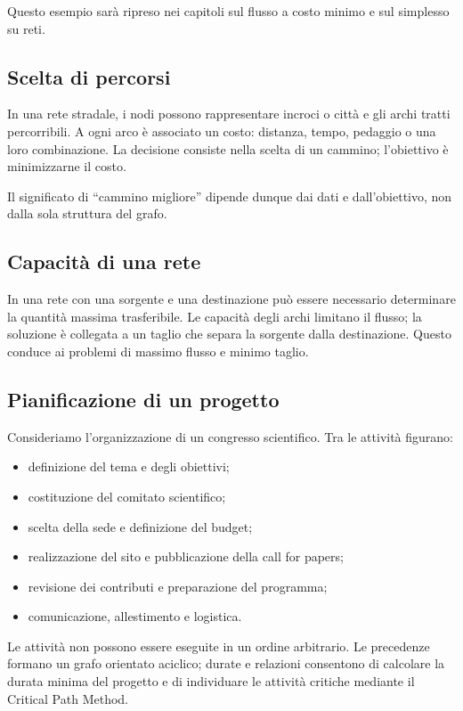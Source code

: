 \documentclass[11pt,a4paper]{article}
\begin{document}
Questo esempio sarà ripreso nei capitoli sul flusso a costo minimo e sul simplesso su reti.

\subsection{Scelta di percorsi}

In una rete stradale, i nodi possono rappresentare incroci o città e gli archi tratti percorribili. A ogni arco è associato un costo: distanza, tempo, pedaggio o una loro combinazione. La decisione consiste nella scelta di un cammino; l'obiettivo è minimizzarne il costo.

Il significato di ``cammino migliore'' dipende dunque dai dati e dall'obiettivo, non dalla sola struttura del grafo.

\subsection{Capacità di una rete}

In una rete con una sorgente e una destinazione può essere necessario determinare la quantità massima trasferibile. Le capacità degli archi limitano il flusso; la soluzione è collegata a un taglio che separa la sorgente dalla destinazione. Questo conduce ai problemi di massimo flusso e minimo taglio.

\subsection{Pianificazione di un progetto}

Consideriamo l'organizzazione di un congresso scientifico. Tra le attività figurano:
\begin{itemize}[nosep]
\item definizione del tema e degli obiettivi;
\item costituzione del comitato scientifico;
\item scelta della sede e definizione del budget;
\item realizzazione del sito e pubblicazione della call for papers;
\item revisione dei contributi e preparazione del programma;
\item comunicazione, allestimento e logistica.
\end{itemize}
Le attività non possono essere eseguite in un ordine arbitrario. Le precedenze formano un grafo orientato aciclico; durate e relazioni consentono di calcolare la durata minima del progetto e di individuare le attività critiche mediante il Critical Path Method.
\end{document}
